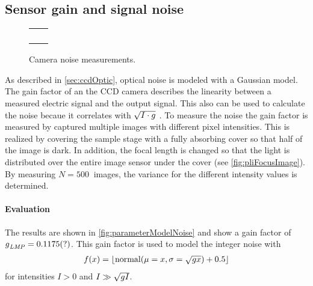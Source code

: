 \subsection{Sensor gain and signal noise}\label{sec:sensorGain}
%
\begin{figure}[!t]
\centering
%
\setlength{\tikzwidth}{0.3\textwidth}
\setlength{\tikzheight}{0.3\textwidth}
%
\setlength{\tabcolsep}{0em}
\begin{tabular}{C{0.5\textwidth}C{0.5\textwidth}}
&
\\[-1em]
%
 &
 \\[2em]
%
&
\\[-1em]
%
 &
\end{tabular}
%
\caption{Camera noise measurements.}
\label{fig:parameterModelGain}
\end{figure}
%
As described in \cref{sec:ccdOptic}, optical noise is modeled with a Gaussian model.
The gain factor of an the \ac{CCD} camera describes the linearity between a measured electric signal and the output signal.
This also can be used to calculate the noise becaue it correlates with $\sqrt{I \cdot \textnormal{$g$}}$ \cite{Wiese:887678}.
To measure the noise the gain factor is measured by captured multiple images with different pixel intensities.
This is realized by covering the sample stage with a fully absorbing cover so that half of the image is dark.
In addition, the focal length is changed so that the light is distributed over the entire image sensor under the cover (see \cref{fig:pliFocusImage}).
By measuring $N=\SI{500}{}$ images, the variance for the different intensity values is determined.
%
\paragraph{Evaluation}
The results are shown in \cref{fig:parameterModelNoise} and show a gain factor of $\textnormal{$g$}_{\mathit{LMP}} = \SI{0.1175}{}(?)$.
This gain factor is used to model the integer noise with
\begin{align}
f(x) = \lfloor\mathrm{normal}(\mu = x, \sigma=\sqrt{\textnormal{$g$} x})+0.5\rfloor
\end{align}
for intensities $I > 0$ and $I \gg \sqrt{\textnormal{$g$} I}$.
%
%
%
